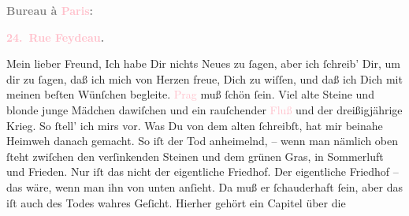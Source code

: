            \pstart
           \begin{otherlanguage}{french}\textcolor{gray}{\textbf{\textbf{Bureau à \textcolor{pink}{Paris}{}\ledrightnote{\textcolor{pink}{Paris}}:}}}\end{otherlanguage}\pend
           \pstart
           \begin{otherlanguage}{french}\textcolor{gray}{\textbf{\textbf{\textcolor{pink}{24. Rue Feydeau}{}\ledrightnote{\textcolor{pink}{rue Feydeau}}.}}}\end{otherlanguage}\pend
           \pstart\center{}Mein lieber Freund,\pend\pstart
           Ich habe Dir nichts Neues zu ſagen, aber ich ſchreib’ Dir, um dir zu ſagen, daß ich
               mich von Herzen freue, Dich \label{K_L02739-1v}\label{K_L02739-1h} zu wiſſen, und daß ich Dich mit meinen
               beſten Wünſchen begleite.\pend
           \pstart
           \textcolor{pink}{Prag}{}\ledrightnote{\textcolor{pink}{Prag}} muß ſchön ſein. Viel alte Steine und blonde
               junge Mädchen dawiſchen {\pb}und ein rauſchender \textcolor{pink}{Fluß}{} und der dreißigjährige
               Krieg. So ſtell’ ich mirs vor. Was Du von dem alten \label{K_L02739-2v}\label{K_L02739-2h}
               ſchreibſt, hat mir beinahe Heimweh danach gemacht. So iſt der Tod anheimelnd, – wenn
               man nämlich oben ſteht zwiſchen den verſinkenden Steinen und dem grünen Gras, in
               Sommerluft und Frieden. Nur iſt das nicht der eigentliche Friedhof. Der eigentliche
                  {\pb}Friedhof – das wäre, wenn man ihn von unten
               anſieht. Da muß er ſchauderhaft ſein, aber das  iſt auch des Todes wahres Geſicht. Hierher gehört ein Capitel über die
